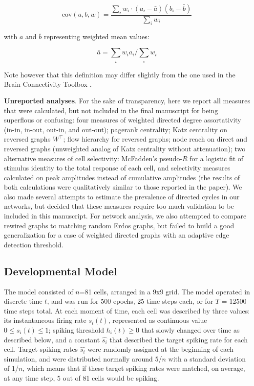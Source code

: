 \documentclass{article}
\begin{document}
\[ \text{cov}(a,b,w) = \frac{\sum_i{w_i \cdot (a_i-\bar{a})(b_i-\bar{b})}}{\sum_i{w_i}} \]

with $\bar{a}$ and $\bar{b}$ representing weighted mean values: 

\[ \bar{a}=\sum_i{w_i a_i}/\sum_i{w_i} \]

Note however that this definition may differ slightly from the one used in the Brain Connectivity Toolbox \citep{rubinov2010toolbox}.

\textbf{Unreported analyses}. For the sake of transparency, here we report all measures that were calculated, but not included in the final manuscript for being superflous or confusing: four measures of weighted directed degree assortativity (in-in, in-out, out-in, and out-out); pagerank centrality; Katz centrality on reversed graphs $W^\top$; flow hierarchy for reversed graphs; node reach on direct and reversed graphs (unweighted analog of Katz centrality without attenuation); two alternative measures of cell selectivity: McFadden’s pseudo-$R$ for a logistic fit of stimulus identity to the total response of each cell, and selectivity measures calculated on peak amplitudes instead of cumulative amplitudes (the results of both calculations were qualitatively similar to those reported in the paper). We also made several attempts to estimate the prevalence of directed cycles in our networks, but decided that these measures require too much validation to be included in this manuscript. For network analysis, we also attempted to compare rewired graphs to matching random Erdos graphs, but failed to build a good generalization for a case of weighted directed graphs with an adaptive edge detection threshold.

\subsection*{Developmental Model}

The model consisted of $n$=81 cells, arranged in a 9x9 grid. The model operated in discrete time $t$, and was run for 500 epochs, 25 time steps each, or for $T$ = 12500 time steps total. At each moment of time, each cell was described by three values: its instantaneous firing rate $s_i(t)$, represented as continuous value $0 \leqslant s_i(t) \leqslant 1$; spiking threshold $h_i(t) \geqslant 0$ that slowly changed over time as described below, and a constant $\hat{s_i}$ that described the target spiking rate for each cell. Target spiking rates $\hat{s_i}$ were randomly assigned at the beginning of each simulation, and were distributed normally around 5/$n$ with a standard deviation of 1/$n$, which means that if these target spiking rates were matched, on average, at any time step, 5 out of 81 cells would be spiking.
\end{document}
